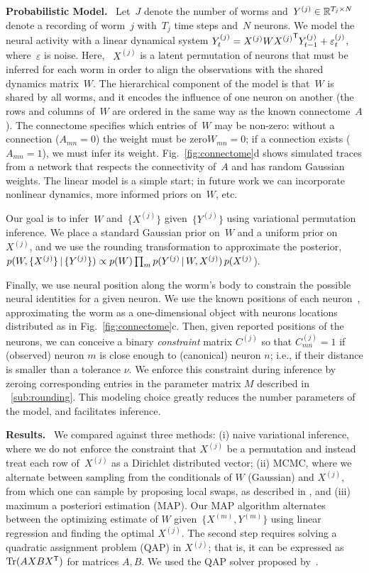 \documentclass[twoside]{article}
\DeclareRobustCommand{\parhead}[1]{\textbf{#1}~}
\begin{document}
\parhead{Probabilistic Model.}  Let~$J$ denote the number of worms
and~${Y^{(j)} \in \mathbb{R}^{T_j \times N}}$ denote a recording of
worm~$j$ with~$T_j$ time steps and~$N$ neurons.  We model the neural
activity with a linear dynamical system
${Y^{(j)}_t = {X^{(j)}} W {X^{(j)}}^{\mathsf{T}}
  Y^{(j)}_{t-1}+\varepsilon^{(j)}_t}$, where~$\varepsilon$ is noise.
Here, ~$X^{(j)}$ is a latent permutation of neurons that must be
inferred for each worm in order to align the observations with the
shared dynamics matrix~$W$.  The hierarchical component of the model
is that~$W$ is shared by all worms, and it encodes the influence of
one neuron on another (the rows and columns of~$W$ are ordered in the
same way as the known connectome~$A$). The connectome specifies which
entries of~$W$ may be non-zero: without a connection (${A_{mn}=0}$)
the weight must be zero${W_{mn}=0}$; if a connection exists (${A_{mn}=1}$),
we must infer its weight.  Fig.~\ref{fig:connectome}d shows
simulated traces from a network that respects the connectivity of~$A$
and has random Gaussian weights.  The linear model is a simple start;
in future work we can incorporate nonlinear dynamics, more informed
priors on~$W$, etc.

Our goal is to infer~$W$ and~$\{X^{(j)}\}$ given~$\{Y^{(j)}\}$ using
variational permutation inference.  We place a standard Gaussian prior
on~$W$ and a uniform prior on~$X^{(j)}$, and we use the rounding
transformation to approximate the posterior,
$p(W,\{X^{(j)}\} \, | \, \{Y^{(j)}\})\propto p(W) \prod_m p(Y^{(j)} \, | \, W, {X^{(j)}}) \,  p({X^{(j)}}$).

Finally, we use neural position along the worm's body to constrain the
possible neural identities for a given neuron.
We use the known positions of each neuron~\citep{wormatlas}, approximating
the worm as a one-dimensional object with neurons locations distributed
as in Fig.~\ref{fig:connectome}c. Then, given reported positions of the
neurons, we can conceive a binary \textit{constraint} matrix
$C^{(j)}$ so that $C^{(j)}_{mn}=1$ if (observed) neuron $m$ is close enough
to (canonical) neuron $n$; i.e., if their distance is smaller than a
tolerance $\nu$. We enforce this constraint during inference by
zeroing corresponding entries in the parameter matrix $M$ described in
~\ref{sub:rounding}.  This modeling choice greatly reduces the number
parameters of the model, and facilitates inference. 

\parhead{Results.} We compared against three methods: (i) naive
variational inference, where we do not enforce the constraint that
$X^{(j)}$ be a permutation and instead treat each row of~$X^{(j)}$ as
a Dirichlet distributed vector; (ii) MCMC, where we alternate between
sampling from the conditionals of $W$ (Gaussian) and ${X^{(j)}}$, from
which one can sample by proposing local swaps, as described in
\cite{Diaconis2009}, and (iii) maximum a posteriori estimation (MAP).
Our MAP algorithm alternates between the optimizing estimate of $W$ given~$\{X^{(m)}, Y^{(m)}\}$ using linear regression and finding the optimal ${X^{(j)}}$. The second step requires solving a quadratic assignment
problem (QAP) in ${X^{(j)}}$; that is, it can be expressed as
$\mathrm{Tr}(AXBX^{\mathsf{T}})$ for matrices $A,B$. We used the QAP solver
proposed by~\citet{Vogelstein2015}.
\end{document}
